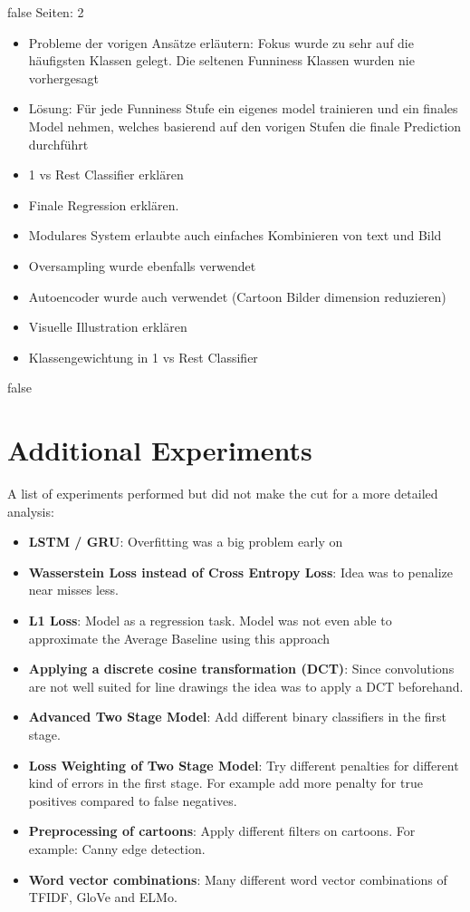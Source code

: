 \documentclass[draft,final,oneside]{vutinfth} %
\begin{document}

\if false
Seiten: 2

\begin{itemize}

\item Probleme der vorigen Ansätze erläutern: Fokus wurde zu sehr auf die häufigsten Klassen gelegt. Die seltenen Funniness Klassen wurden nie vorhergesagt
\item Lösung: Für jede Funniness Stufe ein eigenes model trainieren und ein finales Model nehmen, welches basierend auf den vorigen Stufen die finale Prediction durchführt
\item 1 vs Rest Classifier erklären
\item Finale Regression erklären.
\item Modulares System erlaubte auch einfaches Kombinieren von text und Bild
\item Oversampling wurde ebenfalls verwendet
\item Autoencoder wurde auch verwendet (Cartoon Bilder dimension reduzieren)
\item Visuelle Illustration erklären
\item Klassengewichtung in 1 vs Rest Classifier

\end{itemize}

\fi

\if false
\section{Additional Experiments}
A list of experiments performed but did not make the cut for a more detailed analysis:

\begin{itemize}
\item \textbf{LSTM / GRU}: Overfitting was a big problem early on
\item \textbf{Wasserstein Loss instead of Cross Entropy Loss}: Idea was to penalize near misses less.
\item \textbf{L1 Loss}: Model as a regression task. Model was not even able to approximate the Average Baseline using this approach
\item \textbf{Applying a discrete cosine transformation (DCT)}: Since convolutions are not well suited for line drawings the idea was to apply a DCT beforehand. 
\item \textbf{Advanced Two Stage Model}: Add different binary classifiers in the first stage.
\item \textbf{Loss Weighting of Two Stage Model}: Try different penalties for different kind of errors in the first stage. For example add more penalty for true positives compared to false negatives.
\item \textbf{Preprocessing of cartoons}: Apply different filters on cartoons. For example: Canny edge detection.
\item \textbf{Word vector combinations}: Many different word vector combinations of TFIDF, GloVe and ELMo. 
\end{itemize}
\end{document}
